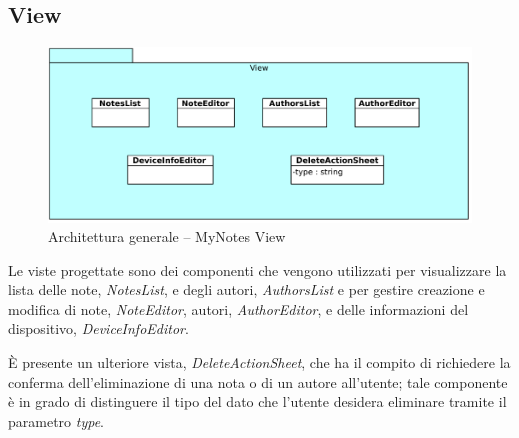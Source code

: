 \subsection{View}
\begin{figure}[htb]
\centering
\includegraphics[scale=0.6]{gfx/class/MyNotes_View.pdf}
\caption{Architettura generale -- MyNotes View}
\label{fig:architettura MyNotes View}
\end{figure}
Le viste progettate sono dei componenti che vengono utilizzati per visualizzare la lista delle note, \emph{NotesList}, e degli autori, \emph{AuthorsList} e per gestire creazione e modifica di note, \emph{NoteEditor}, autori, \emph{AuthorEditor}, e delle informazioni del dispositivo, \emph{DeviceInfoEditor}.

È presente un ulteriore vista, \emph{DeleteActionSheet}, che ha il compito di richiedere la conferma dell'eliminazione di una nota o di un autore all'utente; tale componente è in grado di distinguere il tipo del dato che l'utente desidera eliminare tramite il parametro \emph{type}.

